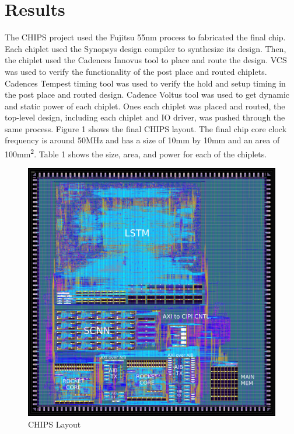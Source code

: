 \documentclass[../main.tex]{subfiles}
\begin{document}
\section{Results}
The CHIPS project used the Fujitsu 55nm process to fabricated the final chip. Each chiplet used the Synopsys design compiler to synthesize its design. Then, the chiplet used the Cadences Innovus tool to place and route the design. VCS was used to verify the functionality of the post place and routed chiplets. Cadences Tempest timing tool was used to verify the hold and setup timing in the post place and routed design. Cadence Voltus tool was used to get dynamic and static power of each chiplet. Ones each chiplet was placed and routed, the top-level design, including each chiplet and IO driver, was pushed through the same process. Figure 1 shows the final CHIPS layout. The final chip core clock frequency is around 50MHz and has a size of 10mm by 10mm and an area of 100mm\textsuperscript{2}. Table 1 shows the size, area, and power for each of the chiplets.

\begin{figure}
    \centering
    \includegraphics[scale=.06]{pngs/CHIPS-Layout.png}
    \caption{CHIPS Layout}
    \label{fig:CHIPS-layout}
\end{figure}
\end{document}
